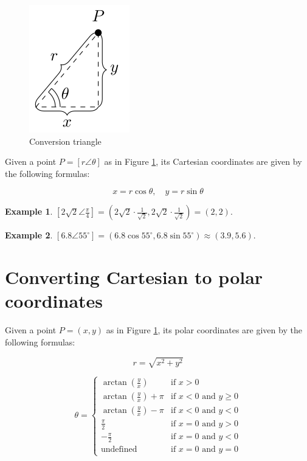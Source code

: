 \documentclass[
  12pt,
  oneside]{book}
\theoremstyle{definition}
\theoremstyle{definition}
\newtheorem{example}{Example}[chapter]
\theoremstyle{definition}
\theoremstyle{definition}
\theoremstyle{remark}
\begin{document}
\begin{figure}

{\centering \includegraphics{t18-polar-pics-2} 

}

\caption{Conversion triangle}\label{fig:t18-triangle}
\end{figure}

Given a point \(P=[r\angle\theta]\) as in Figure \ref{fig:t18-triangle}, its Cartesian coordinates are given by the following formulas:

\[\boxed{x=r\cos\theta, \quad y=r\sin\theta}\]

\begin{example}
\([2\sqrt2\angle \frac\pi4] = (2\sqrt{2}\cdot\frac{1}{\sqrt2},2\sqrt{2}\cdot\frac{1}{\sqrt2})=(2,2)\).
\end{example}

\begin{example}
\([6.8\angle 55^\circ] = (6.8\cos 55^\circ,6.8\sin 55^\circ) \approx(3.9,5.6)\).
\end{example}

\section{Converting Cartesian to polar coordinates}\label{converting-cartesian-to-polar-coordinates}

Given a point \(P=(x,y)\) as in Figure \ref{fig:t18-triangle}, its polar coordinates are given by the following formulas:

\[\boxed{r=\sqrt{x^2+y^2}}\]

\[\boxed{\theta=\begin{cases}
        \arctan(\frac{y}{x}) & \text{if }x>0\\
        \arctan(\frac{y}{x})+\pi &\text{if }x<0\text{ and }y\geq0\\
        \arctan(\frac{y}{x})-\pi &\text{if }x<0\text{ and }y<0\\
        \frac{\pi}2&\text{if }x=0\text{ and }y>0\\
        -\frac{\pi}2&\text{if }x=0\text{ and }y<0\\
        \text{undefined} &\text{if }x=0\text{ and }y=0
\end{cases}}\]
\end{document}
